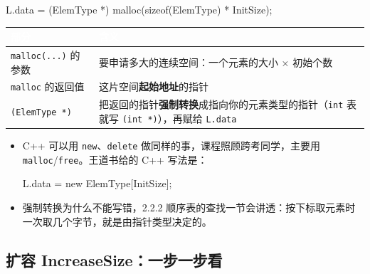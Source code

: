 \documentclass[10.5pt,a4paper,oneside]{article}
\newcommand{\hlred}[1]{\textcolor{wdred}{\bfseries #1}}
\newenvironment{Shaded}{}{}
\newcommand{\KeywordTok}[1]{\textcolor[rgb]{0.12,0.31,0.71}{#1}}
\newcommand{\NormalTok}[1]{#1}
\newcommand{\OperatorTok}[1]{\textcolor[rgb]{0.20,0.20,0.20}{#1}}
\begin{document}
\begin{Shaded}
\begin{Highlighting}[]
\NormalTok{L}\OperatorTok{.}\NormalTok{data }\OperatorTok{=} \OperatorTok{(}\NormalTok{ElemType }\OperatorTok{*)}\NormalTok{ malloc}\OperatorTok{(}\KeywordTok{sizeof}\OperatorTok{(}\NormalTok{ElemType}\OperatorTok{)} \OperatorTok{*}\NormalTok{ InitSize}\OperatorTok{);}
\end{Highlighting}
\end{Shaded}

{
\begin{xltabular}{\linewidth}{>{\hsize\raggedright\arraybackslash}X>{\hsize\raggedright\arraybackslash}X}
\textcolor{white}{\bfseries 部分} & \textcolor{white}{\bfseries 含义} \\
\endfirsthead
\texttt{malloc(...)} 的参数 & 要申请多大的连续空间：一个元素的大小 × 初始个数 \\ \hline
\texttt{malloc} 的返回值 & 这片空间\textbf{起始地址}的指针 \\ \hline
\texttt{(ElemType\ *)} & 把返回的指针\hlred{强制转换}成指向你的元素类型的指针（\texttt{int} 表就写 \texttt{(int\ *)}），再赋给 \texttt{L.data} \\ \hline
\end{xltabular}\par\vspace{4pt}}

\begin{itemize}
\item
  C++ 可以用 \texttt{new}、\texttt{delete}
  做同样的事，课程照顾跨考同学，主要用
  \texttt{malloc}/\texttt{free}。王道书给的 C++ 写法是：

\begin{Shaded}
\begin{Highlighting}[]
\NormalTok{L}\OperatorTok{.}\NormalTok{data }\OperatorTok{=}\NormalTok{ new ElemType}\OperatorTok{[}\NormalTok{InitSize}\OperatorTok{];}
\end{Highlighting}
\end{Shaded}
\item
  强制转换为什么不能写错，2.2.2
  顺序表的查找一节会讲透：按下标取元素时一次取几个字节，就是由指针类型决定的。
\end{itemize}

\hypertarget{ux6269ux5bb9-increasesizeux4e00ux6b65ux4e00ux6b65ux770b}{%
\subsection{扩容
IncreaseSize：一步一步看}\label{ux6269ux5bb9-increasesizeux4e00ux6b65ux4e00ux6b65ux770b}}
\end{document}

